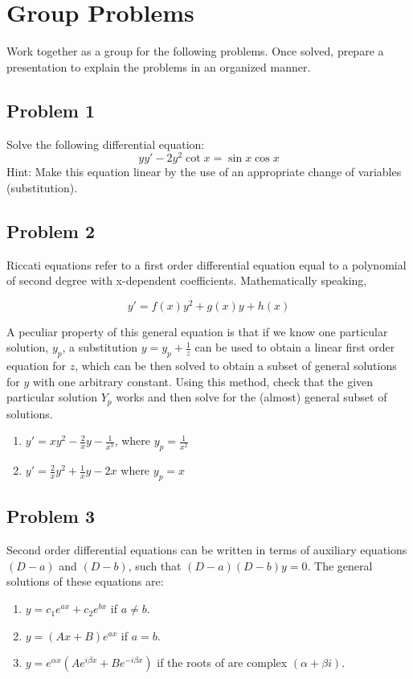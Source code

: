 \documentclass{article}
\begin{document}
  \section{Group Problems}
  Work together as a group for the following problems. Once solved, prepare a presentation to explain the problems in an organized manner.
  \subsection{Problem 1}
  Solve the following differential equation:
  \begin{equation}
      yy'-2y^2\cot x=\sin x \cos x
  \end{equation}
  Hint: Make this equation linear by the use of an appropriate change of variables (substitution).
  \subsection{Problem 2}
  Riccati equations refer to a first order differential equation equal to a polynomial of second degree with x-dependent coefficients. Mathematically speaking,
  
  \begin{equation}
      y'=f(x)y^2+g(x)y+h(x)
  \end{equation}
  
  A peculiar property of this general equation is that if we know one particular solution, $y_p$, a substitution $y=y_p+\frac{1}{z}$ can be used to obtain a linear first order equation for $z$, which can be then solved to obtain a subset of general solutions for $y$ with one arbitrary constant. Using this method, check that the given particular solution $Y_p$ works and then solve for the (almost) general subset of solutions.
  \begin{enumerate}[label=(\alph*)]

\item $y'=xy^2-\frac{2}{x}y-\frac{1}{x^3}$, where $y_p=\frac{1}{x^2}$
\item $y'=\frac{2}{x}y^2+\frac{1}{x}y-2x$
where $y_p=x$

\end{enumerate}

  \subsection{Problem 3}
  Second order differential equations can be written in terms of auxiliary equations $(D-a)$ and $(D-b)$, such that $(D-a)(D-b)y=0$. The general solutions of these equations are:
 \begin{enumerate}
     \item $y=c_1e^{ax}+c_2e^{bx}$ if $a\neq b$.
     \item $y=(Ax+B)e^{ax}$ if $a=b$.
     \item $y=e^{\alpha x}(Ae^{i\beta x}+Be^{-i\beta x})$ if the roots of are complex $(\alpha + \beta i)$.
 \end{enumerate}
 
\end{document}
